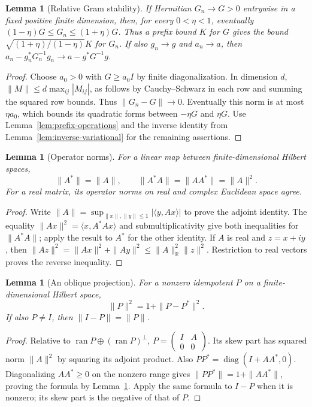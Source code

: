 \documentclass[reqno,a4paper,12pt]{amsart}
\newtheorem{lemma}[theorem]{Lemma}
\theoremstyle{definition}
\newcommand{\R}{\mathbb R}
\newcommand{\ip}[2]{\langle #1,#2\rangle}
\newcommand{\diag}{\operatorname{diag}}
\newcommand{\ran}{\operatorname{ran}}
\begin{document}
\begin{lemma}[Relative Gram stability]\label{lem:gram-stability}
If Hermitian $G_n\to G>0$ entrywise in a fixed positive finite dimension, then,
for every $0<\eta<1$, eventually
$(1-\eta)G\le G_n\le(1+\eta)G$. Thus a prefix bound $K$ for $G$
gives the bound $\sqrt{(1+\eta)/(1-\eta)}K$ for $G_n$.
If also $g_n\to g$ and $a_n\to a$, then
$a_n-g_n^*G_n^{-1}g_n\to a-g^*G^{-1}g$.
\end{lemma}
\begin{proof}
Choose $a_0>0$ with $G\ge a_0I$ by finite diagonalization.
In dimension $d$, $\|M\|\le d\max_{ij}|M_{ij}|$, as follows by
Cauchy--Schwarz in each row and summing the squared row bounds.
Thus $\|G_n-G\|\to0$. Eventually this norm is at most $\eta a_0$,
which bounds its quadratic forms between $-\eta G$ and $\eta G$.
Use Lemma~\ref{lem:prefix-operations} and the inverse identity from
Lemma~\ref{lem:inverse-variational} for the remaining assertions.
\end{proof}

\begin{lemma}[Operator norms]\label{lem:operator-norm}
For a linear map between finite-dimensional Hilbert spaces,
\[
 \|A^*\|=\|A\|,\qquad \|A^*A\|=\|AA^*\|=\|A\|^2.
\]
For a real matrix, its operator norms on real and complex Euclidean
space agree.
\end{lemma}
\begin{proof}
Write $\|A\|=\sup_{\|x\|,\|y\|\le1}|\ip{y}{Ax}|$ to prove the
adjoint identity. The equality
$\|Ax\|^2=\ip{x}{A^*Ax}$ and submultiplicativity give both inequalities
for $\|A^*A\|$; apply the result to $A^*$ for the other identity.
If $A$ is real and $z=x+iy$, then
$\|Az\|^2=\|Ax\|^2+\|Ay\|^2\le\|A\|_{\R}^2\|z\|^2$.
Restriction to real vectors proves the reverse inequality.
\end{proof}

\begin{lemma}[An oblique projection]\label{lem:oblique}
For a nonzero idempotent $P$ on a finite-dimensional Hilbert space,
\[
 \|P\|^2=1+\|P-P^*\|^2.
\]
If also $P\ne I$, then $\|I-P\|=\|P\|$.
\end{lemma}
\begin{proof}
Relative to $\ran P\oplus(\ran P)^\perp$,
$P=\left(\begin{smallmatrix}I&A\\0&0\end{smallmatrix}\right)$.
Its skew part has squared norm $\|A\|^2$ by squaring its adjoint
product. Also $PP^*=\diag(I+AA^*,0)$.
Diagonalizing $AA^*\ge0$ on the nonzero range gives
$\|PP^*\|=1+\|AA^*\|$, proving the formula by
Lemma~\ref{lem:operator-norm}. Apply the same formula to $I-P$
when it is nonzero; its skew part is the negative of that of $P$.
\end{proof}
\end{document}
